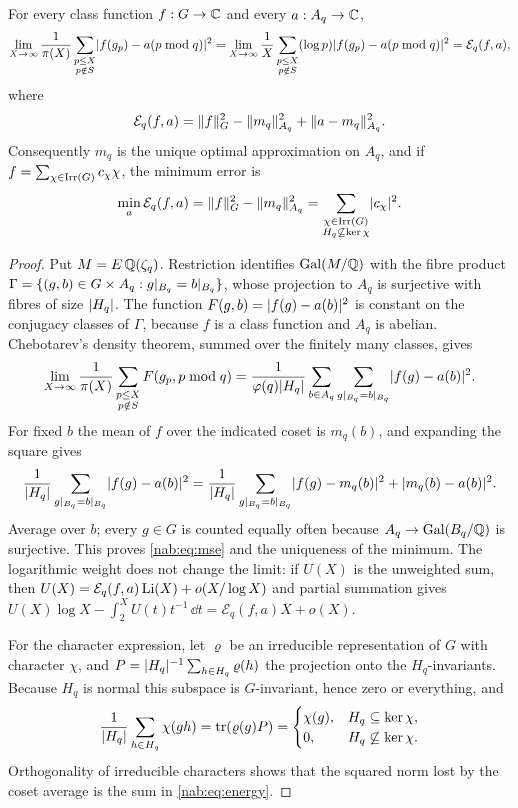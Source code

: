 \begin{theorem}\label{nab:thm:periodic}
For every class function $f:G\to\mathbb{C}$ and every $a:A_q\to\mathbb{C}$,
\[
 \lim_{X\to\infty}\frac1{\pi(X)}\sum_{\substack{p\le X\\p\notin S}}\lvert f(g_p)-a(p\bmod q)\rvert^2
 =\lim_{X\to\infty}\frac1X\sum_{\substack{p\le X\\p\notin S}}(\log p)\lvert f(g_p)-a(p\bmod q)\rvert^2
 =\mathcal E_q(f,a),
\]
where
\begin{equation}\label{nab:eq:mse}
 \mathcal E_q(f,a)=\lVert f\rVert_G^2-\lVert m_q\rVert_{A_q}^2+\lVert a-m_q\rVert_{A_q}^2 .
\end{equation}
Consequently $m_q$ is the unique optimal approximation on $A_q$, and if
$f=\sum_{\chi\in\operatorname{Irr}(G)}c_\chi\chi$, the minimum error is
\begin{equation}\label{nab:eq:energy}
 \min_a\mathcal E_q(f,a)=\lVert f\rVert_G^2-\lVert m_q\rVert_{A_q}^2
 =\sum_{\substack{\chi\in\operatorname{Irr}(G)\\H_q\not\subseteq\ker\chi}}\lvert c_\chi\rvert^2 .
\end{equation}
\end{theorem}
\begin{proof}
Put $M=E\,\mathbb{Q}(\zeta_q)$. Restriction identifies $\operatorname{Gal}(M/\mathbb{Q})$ with the fibre product
$\Gamma=\{(g,b)\in G\times A_q:g|_{B_q}=b|_{B_q}\}$, whose projection to $A_q$ is
surjective with fibres of size $\lvert H_q\rvert$. The function
$F(g,b)=\lvert f(g)-a(b)\rvert^2$ is constant on the conjugacy classes of $\Gamma$, because $f$ is
a class function and $A_q$ is abelian. Chebotarev's density theorem, summed over the
finitely many classes, gives
\[
 \lim_{X\to\infty}\frac1{\pi(X)}\sum_{\substack{p\le X\\p\notin S}}F(g_p,p\bmod q)
 =\frac1{\varphi(q)\lvert H_q\rvert}\sum_{b\in A_q}\sum_{g|_{B_q}=b|_{B_q}}\lvert f(g)-a(b)\rvert^2 .
\]
For fixed $b$ the mean of $f$ over the indicated coset is $m_q(b)$, and expanding the
square gives
\[
 \frac1{\lvert H_q\rvert}\sum_{g|_{B_q}=b|_{B_q}}\lvert f(g)-a(b)\rvert^2
 =\frac1{\lvert H_q\rvert}\sum_{g|_{B_q}=b|_{B_q}}\lvert f(g)-m_q(b)\rvert^2+\lvert m_q(b)-a(b)\rvert^2 .
\]
Average over $b$; every $g\in G$ is counted equally often because
$A_q\to\operatorname{Gal}(B_q/\mathbb{Q})$ is surjective. This proves \eqref{nab:eq:mse} and the uniqueness of
the minimum. The logarithmic weight does not change the limit: if $U(X)$ is the
unweighted sum, then $U(X)=\mathcal E_q(f,a)\operatorname{Li}(X)+o(X/\log X)$ and partial summation gives
$U(X)\log X-\int_2^XU(t)t^{-1}\,\dd t=\mathcal E_q(f,a)X+o(X)$.

For the character expression, let $\varrho$ be an irreducible representation of $G$ with
character $\chi$, and $P=\lvert H_q\rvert^{-1}\sum_{h\in H_q}\varrho(h)$ the projection onto the
$H_q$-invariants. Because $H_q$ is normal this subspace is $G$-invariant, hence zero or
everything, and
\[
 \frac1{\lvert H_q\rvert}\sum_{h\in H_q}\chi(gh)=\operatorname{tr}(\varrho(g)P)=
 \begin{cases}\chi(g),&H_q\subseteq\ker\chi,\\0,&H_q\not\subseteq\ker\chi.\end{cases}
\]
Orthogonality of irreducible characters shows that the squared norm lost by the coset
average is the sum in \eqref{nab:eq:energy}.
\end{proof}

